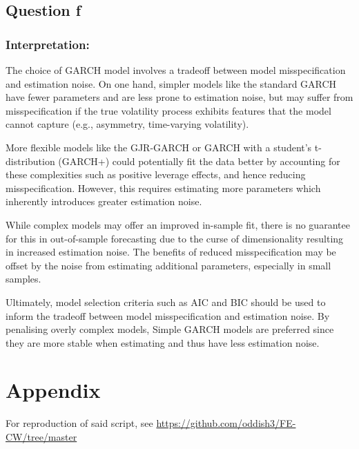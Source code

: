 \documentclass{article}
\begin{document}
\subsection*{Question f}
\subsubsection*{Interpretation:}

The choice of GARCH model involves a tradeoff between model misspecification and estimation noise. On one hand, simpler models like the standard GARCH have fewer parameters and are less prone to estimation noise, but may suffer from misspecification if the true volatility process exhibits features that the model cannot capture (e.g., asymmetry, time-varying volatility).

More flexible models like the GJR-GARCH or GARCH with a student's t-distribution (GARCH+) could potentially fit the data better by accounting for these complexities such as  positive leverage effects, and hence reducing misspecification. 
However, this requires estimating more parameters which inherently introduces greater estimation noise.

While complex models may offer an improved in-sample fit, there is no guarantee for this in out-of-sample forecasting due to the curse of dimensionality resulting in increased estimation noise. 
The benefits of reduced misspecification may be offset by the noise from estimating additional parameters, especially in small samples.

Ultimately, model selection criteria such as AIC and BIC should be used to inform the tradeoff between  model misspecification and estimation noise. 
By penalising overly complex models, Simple GARCH models are preferred since they are more stable when estimating and thus have less estimation noise.


\newpage
\section*{Appendix}

For reproduction of said script, see \url{https://github.com/oddish3/FE-CW/tree/master}


\end{document}
